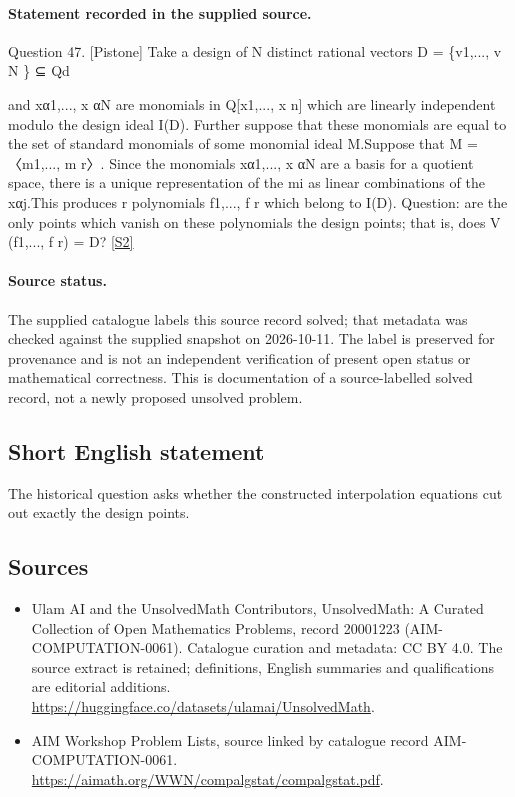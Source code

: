 \documentclass[11pt]{article}
\begin{document}
\paragraph{Statement recorded in the supplied source.}
Question 47. [Pistone] Take a design of N distinct rational vectors D = \{v1,..., v N \} ⊆ Qd

and xα1,..., x αN are monomials in Q[x1,..., x n] which are linearly independent modulo the design ideal I(D). Further suppose that these monomials are equal to the set of standard monomials of some monomial ideal M.Suppose that M = 〈m1,..., m r〉. Since the monomials xα1,..., x αN are a basis for a quotient space, there is a unique representation of the mi as linear combinations of the xαj.This produces r polynomials f1,..., f r which belong to I(D). Question: are the only points which vanish on these polynomials the design points; that is, does V (f1,..., f r) = D? \href{https://aimath.org/WWN/compalgstat/compalgstat.pdf}{[S2]}
\paragraph{Source status.}
The supplied catalogue labels this source record solved; that metadata was checked against the supplied snapshot on 2026-10-11. The label is preserved for provenance and is not an independent verification of present open status or mathematical correctness. This is documentation of a source-labelled solved record, not a newly proposed unsolved problem.
\subsection{Short English statement}
The historical question asks whether the constructed interpolation equations cut out exactly the design points.
\subsection{Sources}
\begin{itemize}
\item[S1] Ulam AI and the UnsolvedMath Contributors, UnsolvedMath: A Curated Collection of Open Mathematics Problems, record 20001223 (AIM-COMPUTATION-0061). Catalogue curation and metadata: CC BY 4.0. The source extract is retained; definitions, English summaries and qualifications are editorial additions.
\url{https://huggingface.co/datasets/ulamai/UnsolvedMath}.
\item[S2] AIM Workshop Problem Lists, source linked by catalogue record AIM-COMPUTATION-0061.
\url{https://aimath.org/WWN/compalgstat/compalgstat.pdf}.
\end{itemize}
\end{document}
